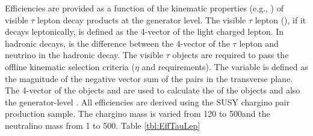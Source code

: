 Efficiencies are provided as a function of the kinematic properties (e.g., \pt) of visible $\tau$ lepton 
decay products at the generator level. The visible $\tau$ lepton (\visTau), if it decays leptonically, 
is defined as the 4-vector of the light charged lepton. In hadronic decays, \visTau is the difference 
between the 4-vector of the $\tau$ lepton and neutrino in the hadronic decay. 
The visible $\tau$ objects are required to pass the offline kinematic selection criteria ($\eta$ and \pt requirements). 
The \genMET variable is defined as the magnitude of the negative vector sum of the \visTau pairs in the transverse plane. 
The 4-vector of the \visTau objects and \genMET are used to calculate the \mt of the \visTau objects and  also the generator-level \mttwo.  
All efficiencies are derived using the SUSY chargino pair production sample. 
The chargino mass is varied from 120 to 500\GeV and the neutralino mass from 1 to 500\GeV. 
Table \ref{tbl:EffTauLep}
